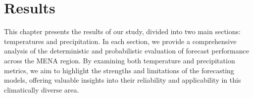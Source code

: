 \chapter{Results}
This chapter presents the results of our study, divided into two main sections: temperatures and precipitation. In each section, we provide a comprehensive analysis of the deterministic and probabilistic evaluation of forecast performance across the MENA region. By examining both temperature and precipitation metrics, we aim to highlight the strengths and limitations of the forecasting models, offering valuable insights into their reliability and applicability in this climatically diverse area.
%
%
